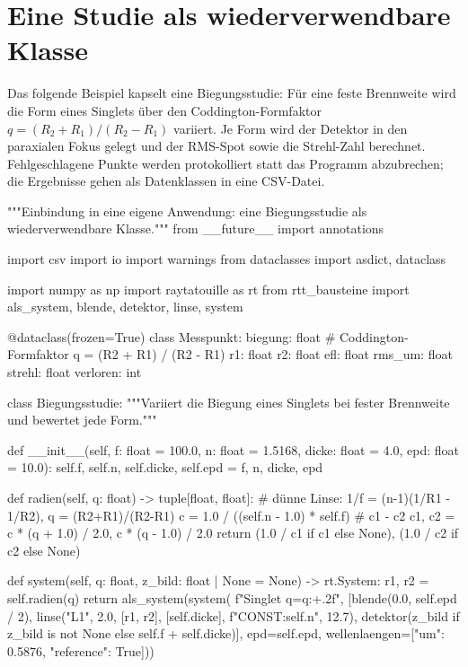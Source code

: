 \documentclass[11pt,a4paper,openany]{book}
\DeclareRobustCommand{\code}[1]{\texttt{\directlua{rttcode("\luaescapestring{\detokenize{#1}}")}}}
\begin{document}
\section{Eine Studie als wiederverwendbare Klasse}

Das folgende Beispiel kapselt eine Biegungsstudie: Für eine feste Brennweite wird die Form
eines Singlets über den Coddington-Formfaktor $q=(R_2+R_1)/(R_2-R_1)$ variiert. Je Form wird
der Detektor in den paraxialen Fokus gelegt und der RMS-Spot sowie die Strehl-Zahl berechnet.
Fehlgeschlagene Punkte werden protokolliert statt das Programm abzubrechen; die Ergebnisse
gehen als Datenklassen in eine CSV-Datei.

\begin{pycode}[title={\code{ex18_anwendung.py}}]
"""Einbindung in eine eigene Anwendung: eine Biegungsstudie als wiederverwendbare Klasse."""
from __future__ import annotations

import csv
import io
import warnings
from dataclasses import asdict, dataclass

import numpy as np
import raytatouille as rt
from rtt_bausteine import als_system, blende, detektor, linse, system


@dataclass(frozen=True)
class Messpunkt:
    biegung: float          # Coddington-Formfaktor q = (R2 + R1) / (R2 - R1)
    r1: float
    r2: float
    efl: float
    rms_um: float
    strehl: float
    verloren: int


class Biegungsstudie:
    """Variiert die Biegung eines Singlets bei fester Brennweite und bewertet jede Form."""

    def __init__(self, f: float = 100.0, n: float = 1.5168, dicke: float = 4.0, epd: float = 10.0):
        self.f, self.n, self.dicke, self.epd = f, n, dicke, epd

    def radien(self, q: float) -> tuple[float, float]:
        # dünne Linse: 1/f = (n-1)(1/R1 - 1/R2), q = (R2+R1)/(R2-R1)
        c = 1.0 / ((self.n - 1.0) * self.f)          # c1 - c2
        c1, c2 = c * (q + 1.0) / 2.0, c * (q - 1.0) / 2.0
        return (1.0 / c1 if c1 else None), (1.0 / c2 if c2 else None)

    def system(self, q: float, z_bild: float | None = None) -> rt.System:
        r1, r2 = self.radien(q)
        return als_system(system(
            f"Singlet q={q:+.2f}",
            [blende(0.0, self.epd / 2),
             linse("L1", 2.0, [r1, r2], [self.dicke], f"CONST:{self.n}", 12.7),
             detektor(z_bild if z_bild is not None else self.f + self.dicke)],
            epd=self.epd, wellenlaengen=[{"um": 0.5876, "reference": True}]))


\end{pycode}
\end{document}
